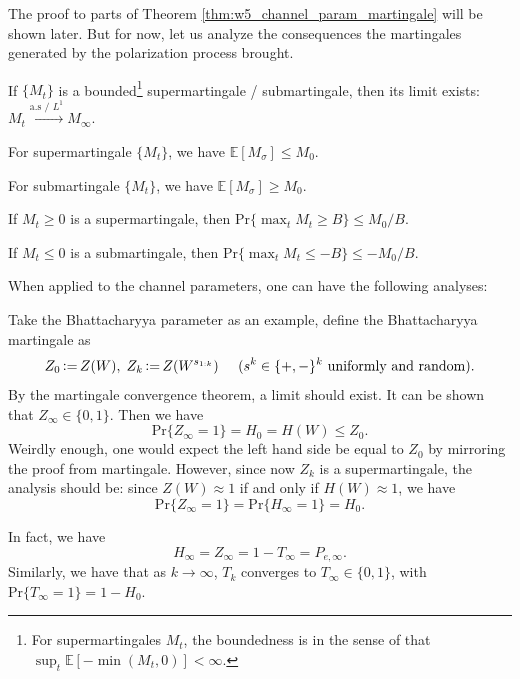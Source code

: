 The proof to parts of Theorem \autoref{thm:w5_channel_param_martingale} will be shown later. But for now, let us analyze the consequences the martingales generated by the polarization process brought.
\begin{theorem}
    If $\{M_t\}$ is a bounded\footnote{For supermartingales $M_t$, the boundedness is in the sense of that $\sup_t \mathbb{E}[-\min(M_t,0)]<\infty$.} supermartingale / submartingale, then its limit exists: $M_t\xrightarrow{\text{a.s / $L^1$}}M_\infty$.
\end{theorem}
\begin{theorem}
    For supermartingale $\{M_t\}$, we have $\mathbb{E}[M_\sigma] \le M_0$.

    For submartingale $\{M_t\}$, we have $\mathbb{E}[M_\sigma] \ge M_0$.
\end{theorem}
\begin{theorem}
    If $M_t\ge 0$ is a supermartingale, then $\mathrm{Pr}\{\max_tM_t\ge B\} \le M_0/B$.

    If $M_t\le 0$ is a submartingale, then $\mathrm{Pr}\{\max_tM_t\le -B\} \le -M_0/B$.
\end{theorem}

When applied to the channel parameters, one can have the following analyses:
\begin{example}
    Take the Bhattacharyya parameter as an example, define the Bhattacharyya martingale as
    \begin{equation}
        Z_0\operatorname{\vcentcolon=} Z(W),\;Z_k\operatorname{\vcentcolon=} Z(W^{s_{1:k}})\;\;\;\;\;(s^k\in\{+,-\}^k \text{ uniformly and random}).
    \end{equation}
    By the martingale convergence theorem, a limit should exist. It can be shown that $Z_\infty\in\{0,1\}$. Then we have
    \begin{equation*}
        \mathrm{Pr}\{Z_\infty=1\} = H_0 = H(W) \le Z_0.
    \end{equation*}
    Weirdly enough, one would expect the left hand side be equal to $Z_0$ by mirroring the proof from martingale. However, since now $Z_k$ is a supermartingale, the analysis should be: since $Z(W)\approx1$ if and only if $H(W)\approx 1$, we have
    \begin{equation}
        \mathrm{Pr}\{Z_\infty=1\} = \mathrm{Pr}\{H_\infty=1\} = H_0.
    \end{equation}
\end{example}

In fact, we have
\begin{equation}
    H_\infty = Z_\infty = 1 - T_\infty = P_{e,\infty}.
\end{equation}
Similarly, we have that as $k\rightarrow\infty$, $T_k$ converges to $T_\infty\in\{0,1\}$, with $\mathrm{Pr}\{T_\infty=1\} = 1-H_0$.

